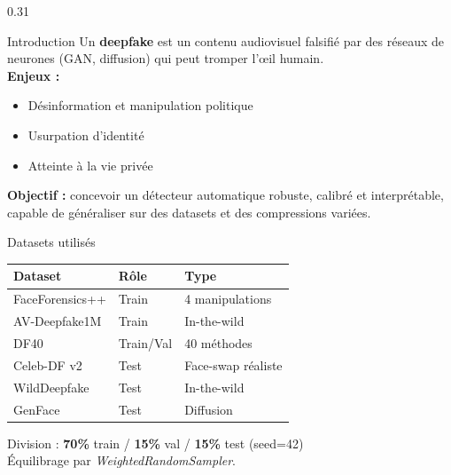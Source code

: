 \documentclass[final]{beamer}
\begin{document}
\begin{frame}[t]
\vspace{0.5cm}

\begin{columns}[t]

\begin{column}{0.31\linewidth}

\begin{block}{Introduction}
Un \textbf{deepfake} est un contenu audiovisuel falsifié par des réseaux de neurones
(GAN, diffusion) qui peut tromper l'œil humain.\\[6pt]
\textbf{Enjeux :}
\begin{itemize}[leftmargin=1.2em, itemsep=2pt]
  \item Désinformation et manipulation politique
  \item Usurpation d'identité
  \item Atteinte à la vie privée
\end{itemize}
\vspace{6pt}
\textbf{Objectif :} concevoir un détecteur automatique robuste, calibré et interprétable,
capable de généraliser sur des datasets et des compressions variées.
\end{block}

\vspace{0.4cm}

\begin{block}{Datasets utilisés}
\centering
\small
\begin{tabular}{@{}lll@{}}
\toprule
\textbf{Dataset} & \textbf{Rôle} & \textbf{Type}\\
\midrule
FaceForensics++ & Train & 4 manipulations\\
AV-Deepfake1M  & Train & In-the-wild\\
DF40           & Train/Val & 40 méthodes\\
Celeb-DF v2    & Test & Face-swap réaliste\\
WildDeepfake   & Test & In-the-wild\\
GenFace        & Test & Diffusion\\
\bottomrule
\end{tabular}
\vspace{4pt}

Division : \textbf{70\%} train / \textbf{15\%} val / \textbf{15\%} test (seed=42)\\
Équilibrage par \textit{WeightedRandomSampler}.
\end{block}


\end{column}
\end{columns}
\end{frame}
\end{document}
